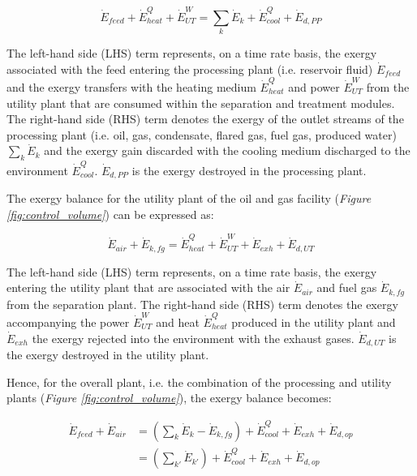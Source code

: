 \documentclass[times,3p]{elsarticle}
\begin{document}
\begin{equation}
	\dot{E}_{feed}+\dot{E}^{Q}_{heat}+\dot{E}^{W}_{UT}=\sum_k\dot{E}_k+\dot{E}^{Q}_{cool}+\dot{E}_{d,PP}
\end{equation}

The left-hand side (LHS) term represents, on a time rate basis, the exergy associated with the feed entering the processing plant (i.e. reservoir fluid) $\dot{E}_{feed}$ and the exergy transfers with the heating medium $\dot{E}^{Q}_{heat}$ and power $\dot{E}^{W}_{UT}$ from the utility plant that are consumed within the separation and treatment modules. The right-hand side (RHS) term denotes the exergy of the outlet streams of the processing plant (i.e. oil, gas, condensate, flared gas, fuel gas, produced water) $\sum_k\dot{E}_k$ and the exergy gain discarded with the cooling medium discharged to the environment $\dot{E}^{Q}_{cool}$. $\dot{E}_{d,PP}$ is the exergy destroyed in the processing plant. 

	
The exergy balance for the utility plant of the oil and gas facility (\emph{Figure \ref{fig:control_volume}}) can be expressed as:
	
\begin{equation}
	\dot{E}_{air}+\dot{E}_{k,fg}=\dot{E}^{Q}_{heat}+\dot{E}^{W}_{UT}+\dot{E}_{exh}+\dot{E}_{d,UT}
\end{equation}

The left-hand side (LHS) term represents, on a time rate basis, the exergy entering the utility plant that are associated with the air $\dot{E}_{air}$ and fuel gas $\dot{E}_{k,fg}$ from the separation plant. The right-hand side (RHS) term denotes the exergy accompanying the power $\dot{E}^{W}_{UT}$ and heat $\dot{E}^{Q}_{heat}$ produced in the utility plant and $\dot{E}_{exh}$ the exergy rejected into the environment with the exhaust gases. $\dot{E}_{d,UT}$ is the exergy destroyed in the utility plant.

Hence, for the overall plant, i.e. the combination of the processing and utility plants (\emph{Figure \ref{fig:control_volume}}), the exergy balance becomes:

\begin{align}
	\dot{E}_{feed}+\dot{E}_{air}&=\left(\sum_k\dot{E}_k-\dot{E}_{k,fg}\right)+\dot{E}^{Q}_{cool}+\dot{E}_{exh}+\dot{E}_{d,op} \nonumber\\
											&=\left(\sum_{k'}\dot{E}_{k'}\right)+\dot{E}^{Q}_{cool}+\dot{E}_{exh}+\dot{E}_{d,op}
\end{align}
\end{document}
